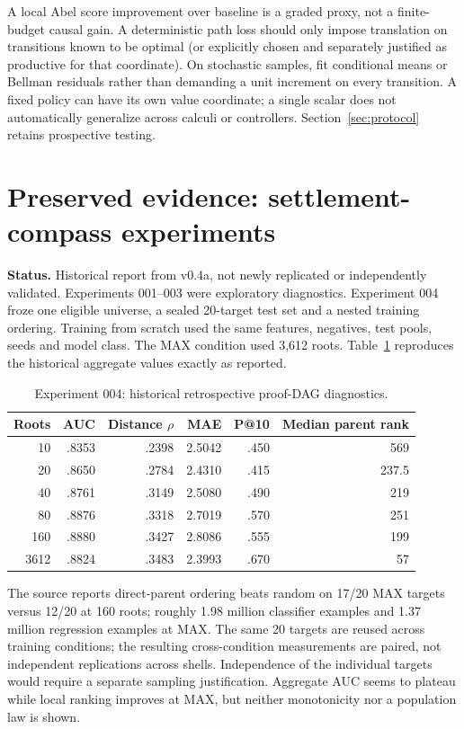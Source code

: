\documentclass[11pt]{article}
\theoremstyle{definition}\newtheorem{definition}[theorem]{Definition}\newtheorem{example}[theorem]{Example}\newtheorem{conjecture}[theorem]{Conjecture}
\newcommand{\status}[1]{\textbf{Status.} #1}
\begin{document}
A local Abel score improvement over baseline is a graded proxy, not a finite-budget causal gain. A deterministic path loss should only impose translation on transitions known to be optimal (or explicitly chosen and separately justified as productive for that coordinate). On stochastic samples, fit conditional means or Bellman residuals rather than demanding a unit increment on every transition. A fixed policy can have its own value coordinate; a single scalar does not automatically generalize across calculi or controllers. Section~\ref{sec:protocol} retains prospective testing.
\section{Preserved evidence: settlement-compass experiments}
\status{Historical report from v0.4a, not newly replicated or independently validated.} Experiments 001--003 were exploratory diagnostics. Experiment 004 froze one eligible universe, a sealed 20-target test set and a nested training ordering. Training from scratch used the same features, negatives, test pools, seeds and model class. The MAX condition used 3,612 roots. Table~\ref{tab:shells} reproduces the historical aggregate values exactly as reported.
\begin{table}[ht]\centering\small
\begin{tabular}{rrrrrr}\toprule Roots&AUC&Distance $\rho$&MAE&P@10&Median parent rank\\\midrule
10&.8353&.2398&2.5042&.450&569\\20&.8650&.2784&2.4310&.415&237.5\\40&.8761&.3149&2.5080&.490&219\\80&.8876&.3318&2.7019&.570&251\\160&.8880&.3427&2.8086&.555&199\\3612&.8824&.3483&2.3993&.670&57\\\bottomrule\end{tabular}
\caption{Experiment 004: historical retrospective proof-DAG diagnostics.}\label{tab:shells}\end{table}
The source reports direct-parent ordering beats random on 17/20 MAX targets versus 12/20 at 160 roots; roughly 1.98 million classifier examples and 1.37 million regression examples at MAX. The same 20 targets are reused across training conditions; the resulting cross-condition measurements are paired, not independent replications across shells. Independence of the individual targets would require a separate sampling justification. Aggregate AUC seems to plateau while local ranking improves at MAX, but neither monotonicity nor a population law is shown.
\end{document}
